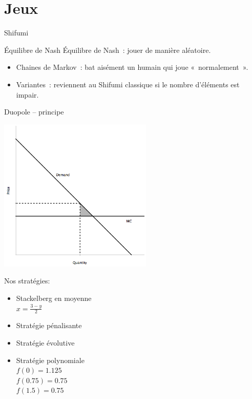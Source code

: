 \documentclass{beamer}
\begin{document}
\section{Jeux}

\begin{frame}{Shifumi}
    \begin{block}{Équilibre de Nash}
        Équilibre de Nash~: jouer de manière aléatoire.
    \end{block}

    \begin{itemize}
        \item Chaines de Markov~: bat aisément un humain qui joue «~normalement~».
        \item Variantes~: reviennent au Shifumi classique si le nombre d'éléments est impair.
    \end{itemize}
\end{frame}

\begin{frame}{Duopole -- principe}
  \begin{vwcol}[widths={0.6,0.4}, sep=.0cm, rule=0pt]
    \includegraphics[width=0.55\textwidth]{jeux/duopole_principe}

    Nos stratégies:
    \begin{itemize}
      \item Stackelberg en moyenne \\
      $x=\frac{3-y}{2}$
      \item Stratégie pénalisante
      \item Stratégie évolutive
      \item Stratégie polynomiale \\
      $f(0) = 1.125$ \\
      $f(0.75) = 0.75$ \\
      $f(1.5) = 0.75$ \\
    \end{itemize}
  \end{vwcol}
\end{frame}
\end{document}
